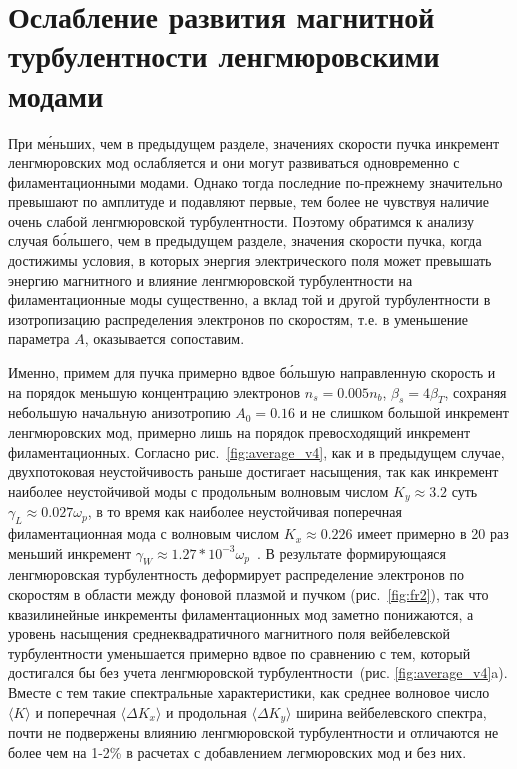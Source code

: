 \section{Ослабление развития магнитной турбулентности ленгмюровскими модами}\label{sec:ch3/sec4}

При м\'{е}ньших, чем в предыдущем разделе, значениях скорости пучка инкремент ленгмюровских мод ослабляется и они могут развиваться одновременно с филаментационными модами. Однако тогда последние по-прежнему значительно превышают по амплитуде и подавляют первые, тем более не чувствуя наличие очень слабой ленгмюровской турбулентности. Поэтому обратимся к анализу случая б\'{о}льшего, чем в предыдущем разделе, значения скорости пучка, когда достижимы условия, в которых энергия электрического поля может превышать энергию магнитного и влияние ленгмюровской турбулентности на филаментационные моды существенно, а вклад той и другой турбулентности в изотропизацию распределения электронов по скоростям, т.е. в уменьшение параметра $A$, оказывается сопоставим.

Именно, примем для пучка примерно вдвое б\'{о}льшую направленную скорость и на порядок меньшую концентрацию электронов $n_s=0.005n_b$, $\beta_s=4\beta_T$, сохраняя небольшую начальную анизотропию $A_0=0.16$ и не слишком большой инкремент ленгмюровских мод, примерно лишь на порядок превосходящий инкремент филаментационных. Согласно рис.~\ref{fig:average_v4}, как и в предыдущем случае, двухпотоковая неустойчивость раньше достигает насыщения, так как инкремент наиболее неустойчивой моды с продольным волновым числом $K_y\approx 3.2$ суть $\gamma_{L}\approx0.027\omega_p$, в то время как наиболее неустойчивая поперечная филаментационная мода с волновым числом $K_x\approx 0.226$ имеет примерно в 20 раз меньший инкремент $\gamma_W\approx1.27*10^{-3}\omega_p$~\cite{Mikhailovsky1971,Davidson1972,Treumann1997,Hao2008, Bret2010}. В результате формирующаяся ленгмюровская турбулентность деформирует распределение электронов по скоростям в области между фоновой плазмой и пучком (рис.~\ref{fig:fr2}), так что квазилинейные инкременты филаментационных мод заметно понижаются, а уровень насыщения среднеквадратичного магнитного поля вейбелевской турбулентности уменьшается примерно вдвое по сравнению с тем, который достигался бы без учета ленгмюровской турбулентности~(рис. \ref{fig:average_v4}a). Вместе с тем такие спектральные характеристики, как среднее волновое число $\langle K\rangle$ и поперечная  $\langle\Delta K_x\rangle$ и продольная $\langle \Delta K_y\rangle$ ширина вейбелевского спектра, почти не подвержены влиянию ленгмюровской турбулентности и отличаются не более чем на 1-2\% в расчетах с добавлением легмюровских мод и без них. 


